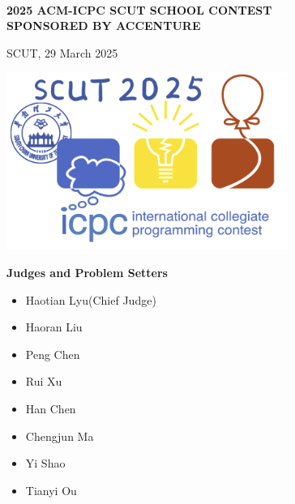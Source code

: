 
\begin{center}
	\huge
	
	\textbf{\sffamily ~\\2025 ACM-ICPC SCUT SCHOOL CONTEST\\SPONSORED BY ACCENTURE}
	
	\bigskip
	
	\textsf{SCUT, 29 March 2025}
	
	\bigskip
	
	\includegraphics[width=.5\linewidth]{icpc-logo.png}
	
	\bigskip\normalsize
	\vspace{1cm}
	\Large
	\textbf{Judges and Problem Setters}

\vspace{0.5cm}
\normalsize
\noindent\begin{minipage}{.5\linewidth}
	\centering 
		\begin{itemize}
			\setlength{\parindent}{5pt}
			\item Haotian Lyu(Chief Judge)
			\item Haoran Liu
			\item Peng Chen
			\item Rui Xu
		\end{itemize}
\end{minipage}%
\begin{minipage}{.5\linewidth}
	\centering 
		\begin{itemize}
			\item Han Chen
			\item Chengjun Ma
			\item Yi Shao
			\item Tianyi Ou
		\end{itemize}
\end{minipage}


\end{center}
